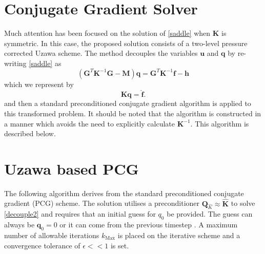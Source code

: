 \documentclass[a4paper]{article}
\newcommand{\pc}{\mbox{${\boldsymbol Q}_{\hat K}$}}	%
\begin{document}
\section{Conjugate Gradient Solver}

Much attention has been focused on the solution of \eqref{saddle} when ${\boldsymbol K}$ is symmetric. \cite{atanga} \cite{ramage} \cite{moresi} In this case, the proposed solution consists of a two-level pressure corrected Uzawa scheme. The method decouples the variables ${\boldsymbol u}$ and ${\boldsymbol q}$ by re-writing \eqref{saddle} as
\begin{equation}
	\left( {\boldsymbol G^T} {\boldsymbol K}^{-1} {\boldsymbol G} - {\boldsymbol M} \right) {\boldsymbol q}  =
	{\boldsymbol G^T} {\boldsymbol K}^{-1} {\boldsymbol f} - {\boldsymbol h}
\label{decouple1}
\end{equation}
which we represent by 
\begin{equation}
\widehat{{\boldsymbol K}} {\boldsymbol  q}  = \widehat{ {\boldsymbol  f}}. 
\label{decouple2}
\end{equation}
and then a standard preconditioned conjugate gradient algorithm is applied to this transformed problem. It should be noted that the algorithm is constructed in a manner which avoids the need to explicitly calculate ${\boldsymbol K}^{-1}$. This algorithm is described below.


\newpage

\section{Uzawa based PCG}
The following algorithm derives from the standard preconditioned conjugate gradient (PCG) scheme. The solution utilises a preconditioner $\pc \approx \widehat{\boldsymbol K}$ to solve \eqref{decouple2} and requires that an initial guess for $q_0$ be provided. The guess can always be $\boldsymbol q_0 = 0$ or it can come from the previous timestep . A maximum number of allowable iterations $k_{\textrm{Max}}$ is placed on the iterative scheme and a convergence tolerance of $\epsilon << 1$ is set.
\end{document}
